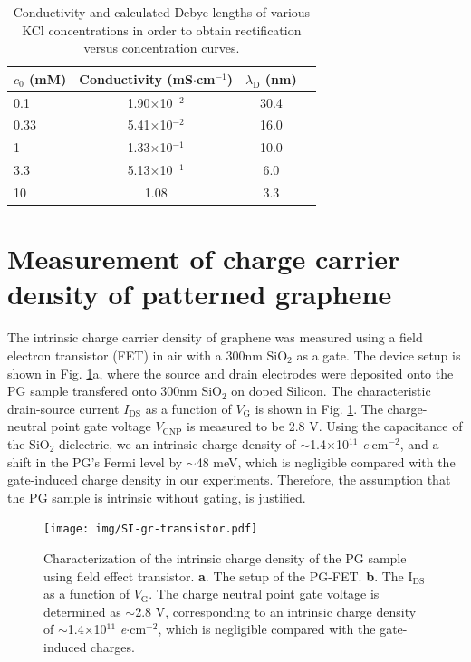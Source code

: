 \documentclass[manuscript=suppinfo,email=true, hyperref=true, keywords=false]{achemso}
\newcommand{\Fig}{Fig.}
\begin{document}
\begin{table}[htbp]
  \centering
  \begin{tabular}{lccc}
    \hline
    $c_{0}$ (mM) & Conductivity (mS$\cdot$cm$^{-1}$) & $\lambda_{\mathrm{D}}$ (nm)\\
    \hline
    0.1&        1.90$\times$10$^{-2}$ &        30.4\\
    0.33&       5.41$\times$10$^{-2}$ & 16.0\\
    1   &1.33$\times$10$^{-1}$ & 10.0\\
    3.3&     5.13$\times$10$^{-1}$ &  6.0\\
    10&      1.08    &3.3\\
    \hline
  \end{tabular}
  \caption{Conductivity and calculated Debye lengths of various KCl
    concentrations in order to obtain rectification versus
    concentration curves. }
  \label{tab:debye}
\end{table}

\section{Measurement of charge carrier density of patterned graphene}
\label{sec:charge-dens}
The intrinsic charge carrier density of graphene was measured using a
field electron transistor (FET) in air with a 300nm SiO$_2$ as a
gate. The device setup is shown in \Fig{} \ref{fig:charge-dens}a,
where the source and drain electrodes were deposited onto the PG
sample transfered onto 300nm SiO$_2$ on doped Silicon. The
characteristic drain-source current $I_{\mathrm{DS}}$ as a function of
$V_{\mathrm{G}}$ is shown in \Fig{} \ref{fig:charge-dens}. The
charge-neutral point gate voltage $V_{\mathrm{CNP}}$ is measured to be 2.8 V.
Using the capacitance of the SiO$_{2}$ dielectric, we an intrinsic
charge density of $\sim{}$1.4$\times$10$^{11}$
\textit{e}$\cdot$cm$^{-2}$, and a shift in the PG's Fermi level by
$\sim{}$48 meV, which is negligible compared with the gate-induced
charge density in our experiments. Therefore, the assumption that the
PG sample is intrinsic without gating, is justified.

\begin{figure}[htbp]
  \centering
  \texttt{[image: img/SI-gr-transistor.pdf]}
  \caption{Characterization of the intrinsic charge density of the PG
    sample using field effect transistor. \textbf{a}. The setup of the
    PG-FET. \textbf{b}. The I$_{\mathrm{DS}}$ as a function of
    $V_{\mathrm{G}}$. The charge neutral point gate voltage is
    determined as $\sim{}$2.8 V, corresponding to an intrinsic charge
    density of $\sim{}$1.4$\times$10$^{11}$
    \textit{e}$\cdot$cm$^{-2}$, which is negligible compared with the
    gate-induced charges.}
  \label{fig:charge-dens}
\end{figure}
\end{document}
